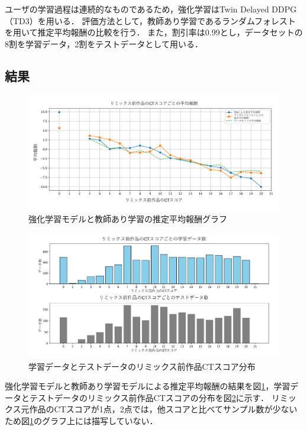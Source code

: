 \documentclass[submit,techrep,noauthor]{ipsj}
\begin{document}
ユーザの学習過程は連続的なものであるため，強化学習はTwin Delayed DDPG（TD3）を用いる．
評価方法として，教師あり学習であるランダムフォレストを用いて推定平均報酬の比較を行う．
また，割引率は0.99とし，データセットの8割を学習データ，2割をテストデータとして用いる．

\subsection{結果}

\begin{figure}[h]
  \centering
  \includegraphics[width=\linewidth]{@IPSJ_SIGSE202511_Horio/fig/estgraph.pdf}
  \caption{強化学習モデルと教師あり学習の推定平均報酬グラフ}
  \label{estgraph}
\end{figure}
\begin{figure}[h]
  \centering
  \includegraphics[width=\linewidth]{@IPSJ_SIGSE202511_Horio/fig/train_testdata.pdf}
  \caption{学習データとテストデータのリミックス前作品CTスコア分布}
  \label{train_testdata}
\end{figure}

強化学習モデルと教師あり学習モデルによる推定平均報酬の結果を図\ref{estgraph}，学習データとテストデータのリミックス前作品CTスコアの分布を図\ref{train_testdata}に示す．
リミックス元作品のCTスコアが1点，2点では，他スコアと比べてサンプル数が少ないため図\ref{estgraph}のグラフ上には描写していない．
\end{document}
